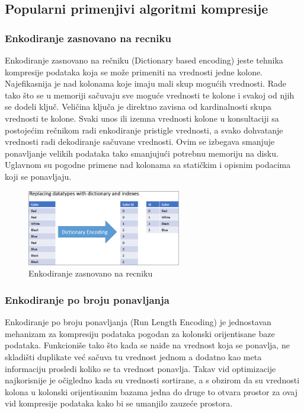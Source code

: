 \documentclass[12pt,oneside]{memoir}
\begin{document}
\subsection{Popularni primenjivi algoritmi kompresije}
\cite{ColumnarOptimizations}
\subsubsection{Enkodiranje zasnovano na recniku}

Enkodiranje zasnovano na rečniku (Dictionary based encoding) jeste tehnika kompresije podataka koja se može primeniti na vrednosti jedne kolone. Najefikasnija je nad kolonama koje imaju mali skup mogućih vrednosti. Rade tako što se u memoriji sačuvaju sve moguće vrednosti te kolone i svakoj od njih se dodeli ključ. Veličina ključa je direktno zavisna od kardinalnosti skupa vrednosti te kolone. Svaki unos ili izemna vrednosti kolone u konsultaciji sa postojećim rečnikom radi enkodiranje pristigle vrednosti, a svako dohvatanje vrednosti radi dekodiranje sačuvane vrednosti. Ovim se izbegava smanjuje ponavljanje velikih podataka tako smanjujući potrebnu memoriju na disku. Uglavnom su pogodne primene nad kolonama sa statičkim i opisnim podacima koji se ponavljaju.
\begin{figure}[!ht]
  \centering
  \includegraphics[width=0.6\textwidth]{DictionaryEncoding.jpg}
  \caption{Enkodiranje zasnovano na recniku}
  \label{fig:grafikon}
\end{figure}


\subsubsection{Enkodiranje po broju ponavljanja}

Enkodiranje po broju ponavljanja (Run Length Encoding) je jednostavan mehanizam za kompresiju podataka pogodan za kolonski orijentisane baze podataka. Funkcioniše tako što kada se naiđe na vrednost koja se ponavlja, ne skladišti duplikate već sačuva tu vrednost jednom a dodatno kao meta informaciju prosledi koliko se ta vrednost ponavlja. Takav vid optimizacije najkorisnije je očigledno kada su vrednosti sortirane, a s obzirom da su vrednosti kolona u kolonski orijentisanim bazama jedna do druge to otvara prostor za ovaj vid kompresije podataka kako bi se umanjilo zauzeće prostora.
\end{document}
